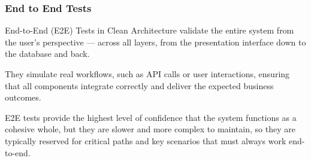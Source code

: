 \documentclass{beamer}
\begin{document}
\begin{frame}
\frametitle{End to End Tests}
End-to-End (E2E) Tests in Clean Architecture validate the entire system from the user’s perspective — across all layers, from the presentation interface down to the database and back.

They simulate real workflows, such as API calls or user interactions, ensuring that all components integrate correctly and deliver the expected business outcomes.

E2E tests provide the highest level of confidence that the system functions as a cohesive whole, but they are slower and more complex to maintain, so they are typically reserved for critical paths and key scenarios that must always work end-to-end.
\end{frame}
\end{document}
